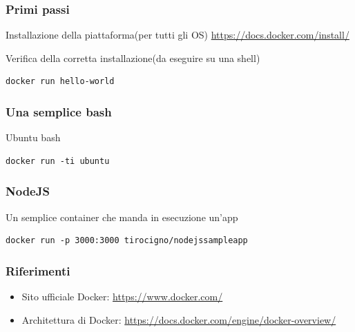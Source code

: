 \documentclass{beamer}
\begin{document}
\begin{frame}[fragile]
\frametitle{Primi passi}

\begin{block}{Installazione della piattaforma(per tutti gli OS)}
\href{https://docs.docker.com/install}{https://docs.docker.com/install/}
\end{block}

\begin{block}{Verifica della corretta installazione(da eseguire su una shell)}
\begin{verbatim}
docker run hello-world
\end{verbatim}
\end{block}
\end{frame}
\begin{frame}[fragile]
\frametitle{Una semplice bash}
\begin{block}{Ubuntu bash}
\begin{verbatim}
docker run -ti ubuntu
\end{verbatim}
\end{block}
\end{frame}


\begin{frame}[fragile]
\frametitle{NodeJS}
\begin{block}{Un semplice container che manda in esecuzione un'app}
\begin{verbatim}
docker run -p 3000:3000 tirocigno/nodejssampleapp
\end{verbatim}
\end{block}
\end{frame}

\begin{frame}
\frametitle{Riferimenti}
\begin{itemize}
\item Sito ufficiale Docker: \href{https://www.docker.com/}{https://www.docker.com/}
\item Architettura di Docker: \href{https://docs.docker.com/engine/docker-overview/}{https://docs.docker.com/engine/docker-overview/}


\end{itemize}
\end{frame}




\begin{frame}
\titlepage %
\end{frame}

\end{document}
